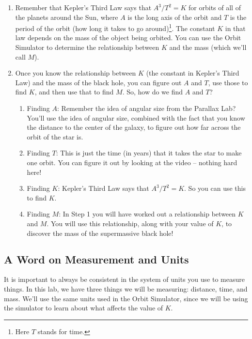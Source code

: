 \documentclass[11pt]{article}
\begin{document}
\begin{enumerate}

\item Remember that Kepler’s Third Law says that $A^3 / T^2 = K$ for orbits of all of the planets around the Sun, where $A$ is the long axis of the orbit and $T$ is the period of the orbit (how long it takes to go around)\footnote{Here $T$ stands for time.}. The constant $K$ in that law depends on the mass of the object being orbited. You can use the Orbit Simulator to determine the relationship between $K$ and the mass (which we’ll call $M$).
\item Once you know the relationship between $K$ (the constant in Kepler’s Third Law) and the mass of the black hole, you can figure out $A$ and $T$, use those to find $K$, and then use that to find $M$. So, how do we find $A$ and $T$?

\begin{enumerate}

\item Finding $A$: Remember the idea of angular size from the Parallax Lab? You’ll use the idea of angular size, combined with the fact that you know the distance to the center of the galaxy, to figure out how far across the orbit of the star is.

\item Finding $T$: This is just the time (in years) that it takes the star to make one orbit. You can figure it out by looking at the video -- nothing hard here!

\item Finding $K$: Kepler’s Third Law says that $A^3 / T^2 = K$. So you can use this to find $K$.

\item Finding $M$: In Step 1 you will have worked out a relationship between $K$ and $M$. You will use this relationship, along with your value of $K$, to discover the mass of the supermassive black hole!
\end{enumerate}
\end{enumerate}
\newpage


\subsection{A Word on Measurement and Units}

It is important to always be consistent in the system of units you use to measure things. In this lab, we have three things we will be measuring: distance, time, and mass. We’ll use the same units used in the Orbit Simulator, since we will be using the simulator to learn about what affects the value of $K$.
\end{document}
